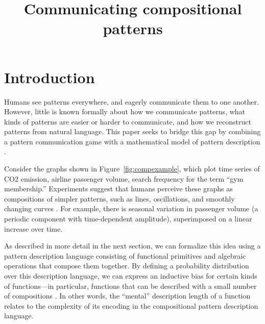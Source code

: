 \documentclass[a4paper,man, floatsintext, natbib]{apa6}
\title{\textbf{Communicating compositional patterns}}
\begin{document}
\maketitle


\section{Introduction}

Humans see patterns everywhere, and eagerly communicate them to one another. However, little is known formally about how we communicate patterns, what kinds of patterns are easier or harder to communicate, and how we reconstruct patterns from natural language. This paper seeks to bridge this gap by combining a pattern communication game with a mathematical model of pattern description \citep{Quiroga285668,schulz2017compositional}.

Consider the graphs shown in Figure~\ref{fig:compexample}, which plot time series of CO2 emission, airline passenger volume, search frequency for the term ``gym membership.'' Experiments suggest that humans perceive these graphs as compositions of simpler patterns, such as lines, oscillations, and smoothly changing curves \citep{Quiroga285668,schulz2017compositional}. For example, there is seasonal variation in passenger volume (a periodic component with time-dependent amplitude), superimposed on a linear increase over time.

As described in more detail in the next section, we can formalize this idea using a pattern description language consisting of functional primitives and algebraic operations that compose them together. By defining a probability distribution over this description language, we can express an inductive bias for certain kinds of functions---in particular, functions that can be described with a small number of compositions \citep{schulz2017compositional,lloyd2014automatic,duvenaud2013structure}. In other words, the ``mental'' description length of a function relates to the complexity of its encoding in the compositional pattern description language.
\end{document}

